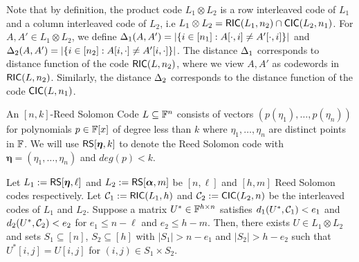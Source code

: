 Note that by definition, the product code $L_1\otimes L_2$ is a row interleaved
code of $L_1$ and a column interleaved code of $L_2$, i.e $L_1\otimes L_2 =
\mathsf{RIC}(L_1,n_2)\cap \mathsf{CIC}(L_2,n_1)$. For $A,A'\in L_1\otimes L_2$, we define
$\Delta_1(A,A')=|\{i\in [n_1]: A[\cdot,i]\neq A'[\cdot,i]\}|$ and
$\Delta_2(A,A')=|\{i\in [n_2]: A[i,\cdot]\neq A'[i,\cdot]\}|$. The distance
$\Delta_1$ corresponds to distance function of the code $\mathsf{RIC}(L,n_2)$, where we
view $A,A'$ as codewords in $\mathsf{RIC}(L,n_2)$. Similarly, the distance $\Delta_2$
corresponds to the distance function of the code $\mathsf{CIC}(L,n_1)$.

\begin{definition}\label{defn:rscode}
An $[n,k]$-Reed Solomon Code $L\subseteq \mathbb{F}^n$ consists of vectors
$(p(\eta_1),\ldots,p(\eta_n))$ for polynomials $p\in \mathbb{F}[x]$ of degree less
than $k$ where $\eta_1,\ldots,\eta_n$ are distinct points in $\mathbb{F}$. We will use
$\mathsf{RS}[\bm{\eta},k]$ to denote the Reed Solomon code with
$\bm{\eta}=(\eta_1,\ldots,\eta_n)$ and $deg(p)<k$.
\end{definition}

\begin{lemma}\label{lem:bicdecoding}
Let $L_1 := \mathsf{RS}[\bm{\eta},\ell]$ and $L_2 := \mathsf{RS}[\bm{\alpha},m]$ be $[n,\ell]$ and
$[h,m]$ Reed Solomon codes respectively. Let $\mathcal{C}_1 := \mathsf{RIC}(L_1,h)$ and
$\mathcal{C}_2 := \mathsf{CIC}(L_2,n)$ be the interleaved codes of $L_1$ and $L_2$. Suppose
a matrix $U^\ast\in \mathbb{F}^{h\times n}$ satisfies $d_1(U^\ast,\mathcal{C}_1)<e_1$ and
$d_2(U^\ast,\mathcal{C}_2)<e_2$ for $e_1\leq n-\ell$ and $e_2\leq h-m$.
Then, there exists $U\in L_1\otimes L_2$ and sets
$S_1\subseteq [n]$, $S_2\subseteq [h]$ with $|S_1|>n-e_1$ and $|S_2|>h-e_2$ such
that $U^\ast[i,j]=U[i,j]$ for $(i,j)\in S_1\times S_2$.
\end{lemma}

